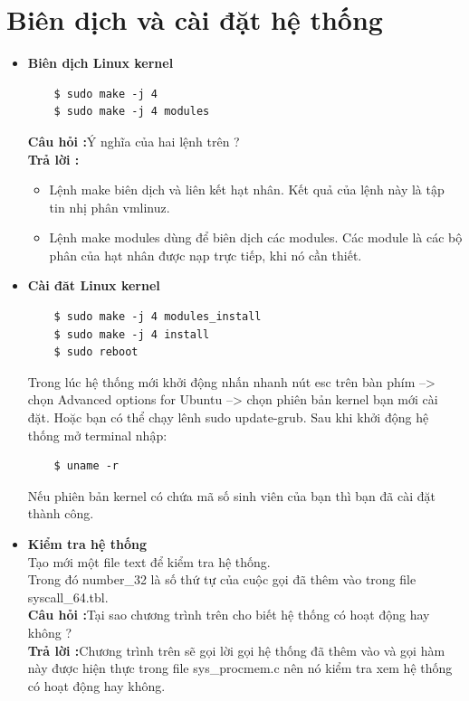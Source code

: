 \documentclass[a4paper,12pt]{article}
\begin{document}
	\section{Biên dịch và cài đặt hệ thống}
	\begin{itemize}
	\item \textbf{Biên dịch Linux kernel}
	\begin{verbatim}
	$ sudo make -j 4
	$ sudo make -j 4 modules
	\end{verbatim}
	\textbf{Câu hỏi :}Ý nghĩa của hai lệnh trên ? \\
	\textbf{Trả lời :}
	\begin{itemize}
	\item Lệnh make biên dịch và liên kết hạt nhân. Kết quả của lệnh này là tập tin nhị phân vmlinuz.
	\item Lệnh make modules dùng để biên dịch các modules. Các module là các bộ phân của hạt nhân được nạp trực tiếp, khi nó cần thiết.
	\end{itemize}
	\item \textbf{Cài đăt Linux kernel}
	\begin{verbatim}
	$ sudo make -j 4 modules_install
	$ sudo make -j 4 install
	$ sudo reboot
	\end{verbatim}
	Trong lúc hệ thống mới khởi động nhấn nhanh nút esc trên bàn phím --> chọn Advanced options for Ubuntu --> chọn phiên bản kernel bạn mới cài đặt. Hoặc bạn có thể chạy lênh sudo update-grub.
	Sau khi khởi động hệ thống mở terminal nhập:
	\begin{verbatim}
	$ uname -r
	\end{verbatim}
	Nếu phiên bản kernel có chứa mã số sinh viên của bạn thì bạn đã cài đặt thành công.
	\item \textbf{Kiểm tra hệ thống} \\
	Tạo mới một file text để kiểm tra hệ thống. \\
	Trong đó number\_32 là số thứ tự của cuộc gọi đã thêm vào trong file syscall\_64.tbl. \\
	\textbf{Câu hỏi :}Tại sao chương trình trên cho biết hệ thống có hoạt động hay không ?\\
	\textbf{Trả lời :}Chương trình trên sẽ gọi lời gọi hệ thống đã thêm vào và gọi hàm này được hiện thực trong file sys\_procmem.c nên nó kiểm tra xem hệ thống có hoạt động hay không.
	\end{itemize}
\end{document}
